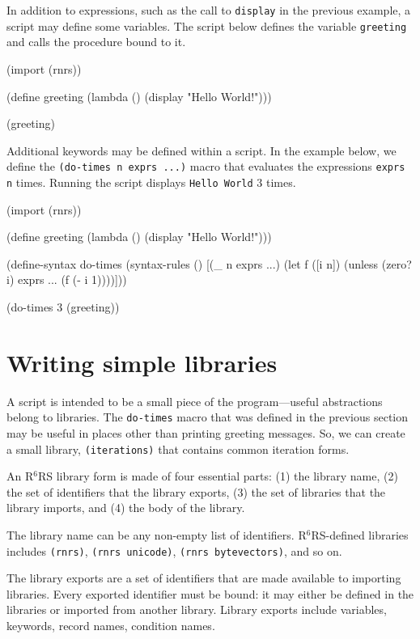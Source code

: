 \documentclass[onecolumn, 12pt, twoside, openright, dvipdfm]{book}
\newcommand{\rnrs}[1]{R$^{\mathrm{#1}}$RS}
\begin{document}
In addition to expressions, such as the call to \texttt{display} in
the previous example, a script may define some variables.  The
script below defines the variable \texttt{greeting} and calls the
procedure bound to it.

\begin{CodeInline}
(import (rnrs))

(define greeting
  (lambda ()
    (display "Hello World!\n")))

(greeting)
\end{CodeInline}

Additional keywords may be defined within a script.  In the example
below, we define the \texttt{(do-times n exprs ...)} macro that
evaluates the expressions \texttt{exprs} \texttt{n} times.  Running
the script displays \texttt{Hello World} 3 times.
\newpage

\begin{CodeInline}
(import (rnrs))

(define greeting
  (lambda ()
    (display "Hello World!\n")))

(define-syntax do-times
  (syntax-rules ()
    [(_ n exprs ...)
     (let f ([i n])
       (unless (zero? i)
         exprs ...
         (f (- i 1))))]))

(do-times 3 (greeting))
\end{CodeInline}


\section{Writing simple libraries}

A script is intended to be a small piece of the program---useful
abstractions belong to libraries.  The \texttt{do-times} macro that
was defined in the previous section may be useful in places other
than printing greeting messages.  So, we can create a small library,
\texttt{(iterations)} that contains common iteration forms.  

An \rnrs{6} library form is made of four essential parts: (1) the
library name, (2) the set of identifiers that the library exports,
(3) the set of libraries that the library imports, and (4) the body
of the library.  


The library name can be any non-empty list of identifiers.
\rnrs{6}-defined libraries includes \texttt{(rnrs)},
\texttt{(rnrs~unicode)}, \texttt{(rnrs~bytevectors)}, and so on.

The library exports are a set of identifiers that are made available
to importing libraries.  Every exported identifier must be bound: it
may either be defined in the libraries or imported from another
library.  Library exports include variables, keywords, record names,
condition names.
\end{document}
